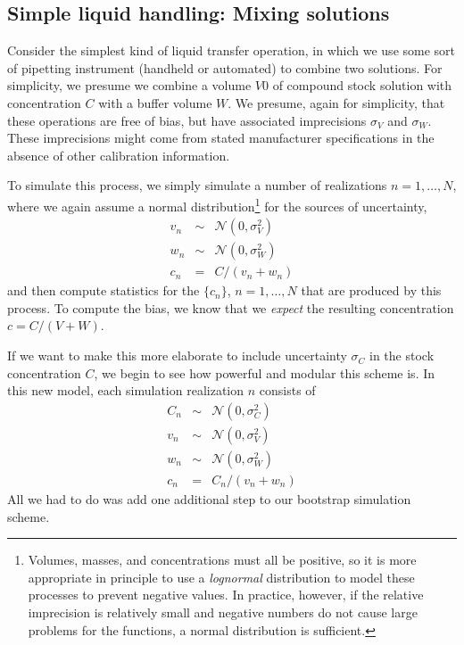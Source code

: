 \documentclass[aps,pre,twocolumn,nofootinbib,superscriptaddress,linenumbers]{revtex4-1}
\begin{document}
\subsection*{Simple liquid handling: Mixing solutions}

Consider the simplest kind of liquid transfer operation, in which we use some sort of pipetting instrument (handheld or automated) to combine two solutions.
For simplicity, we presume we combine a volume $V0$ of compound stock solution with concentration $C$ with a buffer volume $W$.
We presume, again for simplicity, that these operations are free of bias, but have associated imprecisions $\sigma_V$ and $\sigma_W$. 
These imprecisions might come from stated manufacturer specifications in the absence of other calibration information.

To simulate this process, we simply simulate a number of realizations $n = 1, \ldots, N$, where we again assume a normal distribution\footnote{Volumes, masses, and concentrations must all be positive, so it is more appropriate in principle to use a \emph{lognormal} distribution to model these processes to prevent negative values.  In practice, however, if the relative imprecision is relatively small and negative numbers do not cause large problems for the functions, a normal distribution is sufficient.} for the sources of uncertainty,
\begin{eqnarray}
v_n &\sim& \mathcal{N}(0, \sigma_V^2) \nonumber \\
w_n &\sim& \mathcal{N}(0, \sigma_W^2) \nonumber \\
c_n &=& C / (v_n + w_n)
\end{eqnarray}
and then compute statistics for the $\{c_n\}$, $n = 1,\ldots,N$ that are produced by this process.
To compute the bias, we know that we \emph{expect} the resulting concentration $c = C/ (V + W)$.

If we want to make this more elaborate to include uncertainty $\sigma_C$ in the stock concentration $C$, we begin to see how powerful and modular this scheme is.
In this new model, each simulation realization $n$ consists of
\begin{eqnarray}
C_n &\sim& \mathcal{N}(0, \sigma_C^2) \nonumber \\
v_n &\sim& \mathcal{N}(0, \sigma_V^2) \nonumber \\
w_n &\sim& \mathcal{N}(0, \sigma_W^2) \nonumber \\
c_n &=& C_n / (v_n + w_n)
\end{eqnarray}
All we had to do was add one additional step to our bootstrap simulation scheme.
\end{document}
